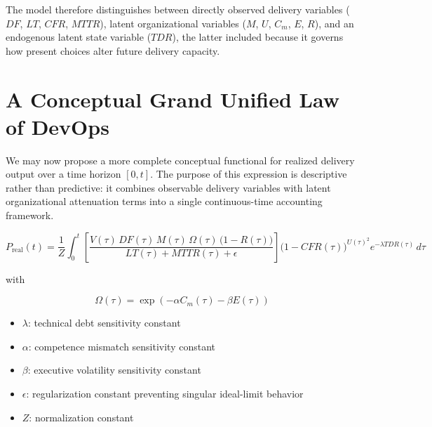 \documentclass[letterpaper]{article}
\begin{document}
The model therefore distinguishes between directly observed delivery variables ($DF$, $LT$, $CFR$, $MTTR$), latent organizational variables ($M$, $U$, $C_m$, $E$, $R$), and an endogenous latent state variable ($TDR$), the latter included because it governs how present choices alter future delivery capacity.

\section{A Conceptual Grand Unified Law of DevOps}
We may now propose a more complete conceptual functional for realized delivery output over a time horizon $[0,t]$. The purpose of this expression is descriptive rather than predictive: it combines observable delivery variables with latent organizational attenuation terms into a single continuous-time accounting framework. 


\begin{equation}
P_{\mathrm{real}}(t)
=
\frac{1}{Z}
\int_{0}^{t}
\left[
\frac{
V(\tau)\,DF(\tau)\,M(\tau)\,\Omega(\tau)\,\bigl(1-R(\tau)\bigr)
}{
LT(\tau) + MTTR(\tau) + \epsilon
}
\right]
\bigl(1 - CFR(\tau)\bigr)^{U(\tau)^2}
e^{-\lambda TDR(\tau)}
\, d\tau
\end{equation}

with

\begin{equation}
\Omega(\tau)
=
\exp\!\left(
-\alpha C_m(\tau)
-\beta E(\tau)
\right)
\end{equation}

\begin{itemize}
    \item $\lambda$: technical debt sensitivity constant
    \item $\alpha$: competence mismatch sensitivity constant
    \item $\beta$: executive volatility sensitivity constant
    \item $\epsilon$: regularization constant preventing singular ideal-limit behavior
    \item $Z$: normalization constant
\end{itemize}
\end{document}
